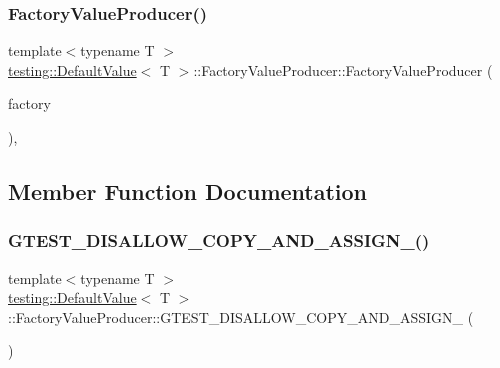 \subsubsection{\texorpdfstring{FactoryValueProducer()}{FactoryValueProducer()}\hspace{0.1cm}{\footnotesize\ttfamily [3/3]}}
{\footnotesize\ttfamily template$<$typename T $>$ \\
\mbox{\hyperlink{classtesting_1_1_default_value}{testing\+::\+Default\+Value}}$<$ T $>$\+::Factory\+Value\+Producer\+::\+Factory\+Value\+Producer (\begin{DoxyParamCaption}\item[{\mbox{\hyperlink{classtesting_1_1_default_value_a5763a68d75e0a4c97fcaff708e2df803}{Factory\+Function}}}]{factory }\end{DoxyParamCaption})\hspace{0.3cm}{\ttfamily [inline]}, {\ttfamily [explicit]}}



\subsection{Member Function Documentation}
\mbox{\label{classtesting_1_1_default_value_1_1_factory_value_producer_a19e5afa4fea1707fe4fa8a50325a4cf9}} 
\subsubsection{\texorpdfstring{GTEST\_DISALLOW\_COPY\_AND\_ASSIGN\_()}{GTEST\_DISALLOW\_COPY\_AND\_ASSIGN\_()}\hspace{0.1cm}{\footnotesize\ttfamily [1/3]}}
{\footnotesize\ttfamily template$<$typename T $>$ \\
\mbox{\hyperlink{classtesting_1_1_default_value}{testing\+::\+Default\+Value}}$<$ T $>$\+::Factory\+Value\+Producer\+::\+G\+T\+E\+S\+T\+\_\+\+D\+I\+S\+A\+L\+L\+O\+W\+\_\+\+C\+O\+P\+Y\+\_\+\+A\+N\+D\+\_\+\+A\+S\+S\+I\+G\+N\+\_\+ (\begin{DoxyParamCaption}\item[{\mbox{\hyperlink{classtesting_1_1_default_value_1_1_factory_value_producer}{Factory\+Value\+Producer}}}]{ }\end{DoxyParamCaption})\hspace{0.3cm}{\ttfamily [private]}}

